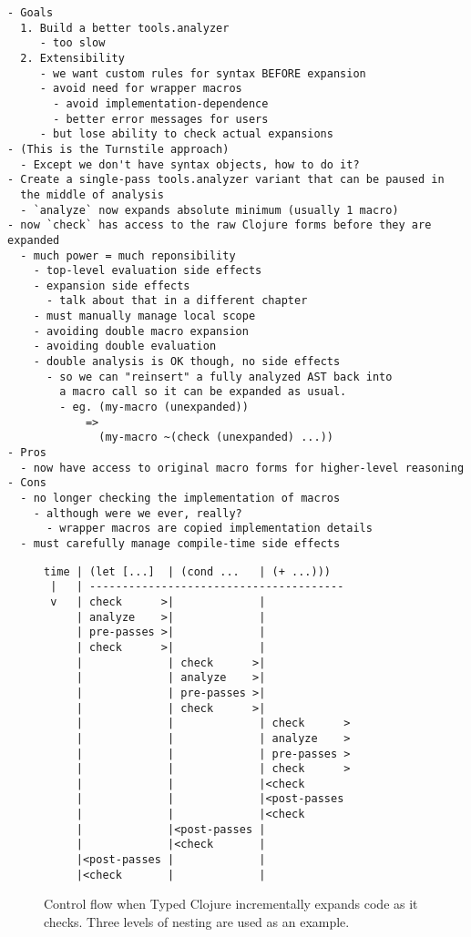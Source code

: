 {
\singlespacing
\begin{verbatim}
- Goals
  1. Build a better tools.analyzer
     - too slow
  2. Extensibility
     - we want custom rules for syntax BEFORE expansion
     - avoid need for wrapper macros
       - avoid implementation-dependence
       - better error messages for users
     - but lose ability to check actual expansions
- (This is the Turnstile approach)
  - Except we don't have syntax objects, how to do it?
- Create a single-pass tools.analyzer variant that can be paused in
  the middle of analysis
  - `analyze` now expands absolute minimum (usually 1 macro)
- now `check` has access to the raw Clojure forms before they are expanded
  - much power = much reponsibility
    - top-level evaluation side effects
    - expansion side effects
      - talk about that in a different chapter
    - must manually manage local scope
    - avoiding double macro expansion
    - avoiding double evaluation
    - double analysis is OK though, no side effects
      - so we can "reinsert" a fully analyzed AST back into
        a macro call so it can be expanded as usual.
        - eg. (my-macro (unexpanded))
            =>
              (my-macro ~(check (unexpanded) ...))
- Pros
  - now have access to original macro forms for higher-level reasoning
- Cons
  - no longer checking the implementation of macros
    - although were we ever, really?
      - wrapper macros are copied implementation details
  - must carefully manage compile-time side effects
\end{verbatim}
}

\begin{figure*}
\singlespacing
\begin{verbatim}
time | (let [...]  | (cond ...   | (+ ...)))
 |   | ---------------------------------------
 v   | check      >|             |
     | analyze    >|             |
     | pre-passes >|             |
     | check      >|             |
     |             | check      >|
     |             | analyze    >|
     |             | pre-passes >|
     |             | check      >|
     |             |             | check      >
     |             |             | analyze    >
     |             |             | pre-passes >
     |             |             | check      >
     |             |             |<check
     |             |             |<post-passes
     |             |             |<check
     |             |<post-passes |
     |             |<check       |
     |<post-passes |             |
     |<check       |             |
\end{verbatim}
  \caption{Control flow when Typed Clojure incrementally expands code as it checks.
  Three levels of nesting are used as an example.
  }
\end{figure*}

